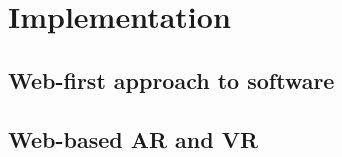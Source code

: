 \chapter{Implementation}

\section{Web-first approach to software}
\label{chapter4-web-first-approach-to-software}






\section{Web-based AR and VR}
\label{chapter2-web-based-ar-and-vr}


